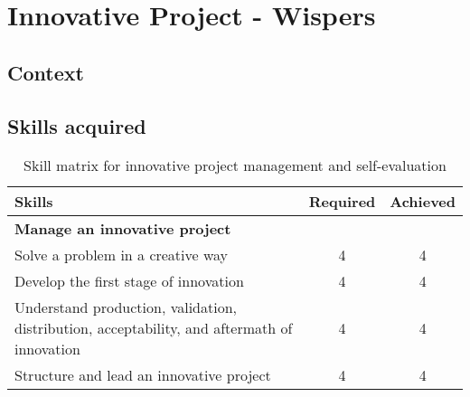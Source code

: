 \section{Innovative Project - Wispers}

\subsection{Context}
\subsection{Skills acquired}

\begin{table}[h!]
    \centering
    \renewcommand{\arraystretch}{1.5} %
    \begin{tabular}{|p{11cm}|c|c|}
    \hline
    \rowcolor[gray]{0.8}
    \textbf{Skills} & \textbf{Required} & \textbf{Achieved} \\ \hline
    \rowcolor[gray]{0.9} \textbf{Manage an innovative project} &  &  \\ \hline
    Solve a problem in a creative way & 4 & 4 \\ \hline
    Develop the first stage of innovation & 4 & 4 \\ \hline
    Understand production, validation, distribution, acceptability, and aftermath of innovation & 4 & 4 \\ \hline
    Structure and lead an innovative project & 4 & 4 \\ \hline
    \end{tabular}
    \caption{Skill matrix for innovative project management and self-evaluation}
    \label{table:skills-innovative}
\end{table}